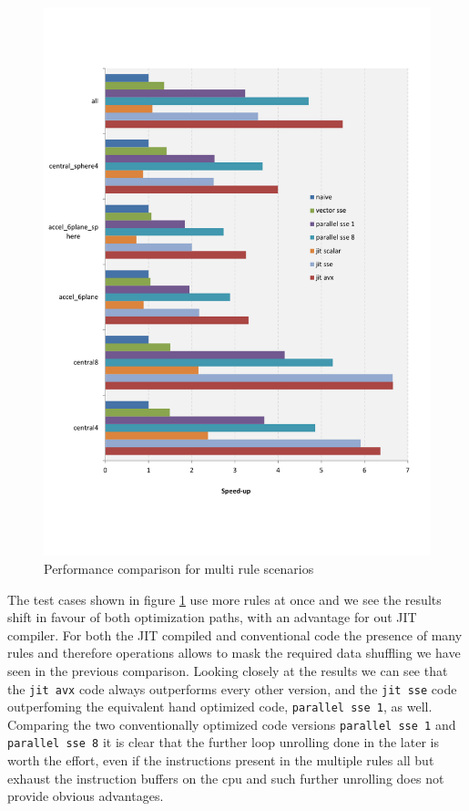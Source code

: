 \begin{figure}[th]\centering
  \includegraphics[scale=0.6]{multi_rules.pdf}
  \caption{Performance comparison for multi rule scenarios
  \label{perf_multi}}
\end{figure}

The test cases shown in figure \ref{perf_multi} use more rules at once and we see the results shift in favour of both optimization paths, with an advantage for out JIT compiler. For both the JIT compiled and conventional code the presence of many rules and therefore operations allows to mask the required data shuffling we have seen in the previous comparison. Looking closely at the results we can see that the \texttt{jit avx} code always outperforms every other version, and the \texttt{jit sse} code outperfoming the equivalent hand optimized code, \texttt{parallel sse 1}, as well. Comparing the two conventionally optimized code versions \texttt{parallel sse 1} and \texttt{parallel sse 8} it is clear that the further loop unrolling done in the later is worth the effort, even if the instructions present in the multiple rules all but exhaust the instruction buffers on the cpu and such further unrolling does not provide obvious advantages.

